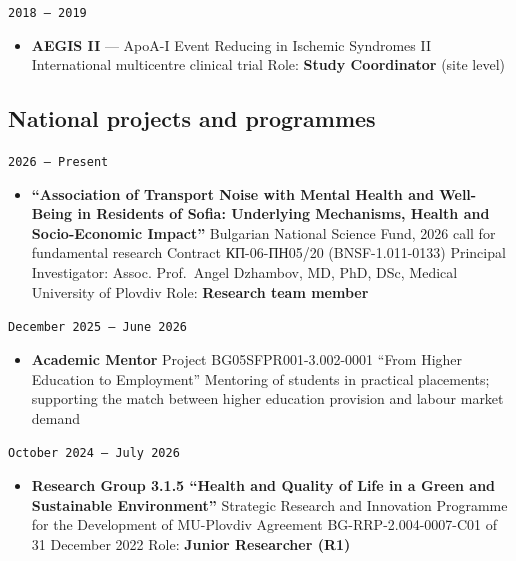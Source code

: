 \documentclass[
  10.5pt,
  a4paper,
  DIV=11,
  numbers=noendperiod]{scrartcl}
\providecommand{\tightlist}{%
  \setlength{\itemsep}{0pt}\setlength{\parskip}{0pt}}
\let\oldtexttt\texttt
\renewcommand{\texttt}[1]{{\color{cvbronze}\small\oldtexttt{#1}}}
\begin{document}
\texttt{2018\ –\ 2019}

\begin{itemize}
\tightlist
\item
  \textbf{AEGIS II} --- ApoA-I Event Reducing in Ischemic Syndromes II
  \textbar{} International multicentre clinical trial \textbar{} Role:
  \textbf{Study Coordinator} (site level)
\end{itemize}

\subsection{National projects and
programmes}\label{national-projects-and-programmes}

\texttt{2026\ –\ Present}

\begin{itemize}
\tightlist
\item
  \textbf{``Association of Transport Noise with Mental Health and
  Well-Being in Residents of Sofia: Underlying Mechanisms, Health and
  Socio-Economic Impact''} \textbar{} Bulgarian National Science Fund,
  2026 call for fundamental research \textbar{} Contract КП-06-ПН05/20
  (BNSF-1.011-0133) \textbar{} Principal Investigator: Assoc.
  Prof.~Angel Dzhambov, MD, PhD, DSc, Medical University of Plovdiv
  \textbar{} Role: \textbf{Research team member}
\end{itemize}

\texttt{December\ 2025\ –\ June\ 2026}

\begin{itemize}
\tightlist
\item
  \textbf{Academic Mentor} \textbar{} Project BG05SFPR001-3.002-0001
  ``From Higher Education to Employment'' \textbar{} Mentoring of
  students in practical placements; supporting the match between higher
  education provision and labour market demand
\end{itemize}

\texttt{October\ 2024\ –\ July\ 2026}

\begin{itemize}
\tightlist
\item
  \textbf{Research Group 3.1.5 ``Health and Quality of Life in a Green
  and Sustainable Environment''} \textbar{} Strategic Research and
  Innovation Programme for the Development of MU-Plovdiv \textbar{}
  Agreement BG-RRP-2.004-0007-C01 of 31 December 2022 \textbar{} Role:
  \textbf{Junior Researcher (R1)}
\end{itemize}
\end{document}
